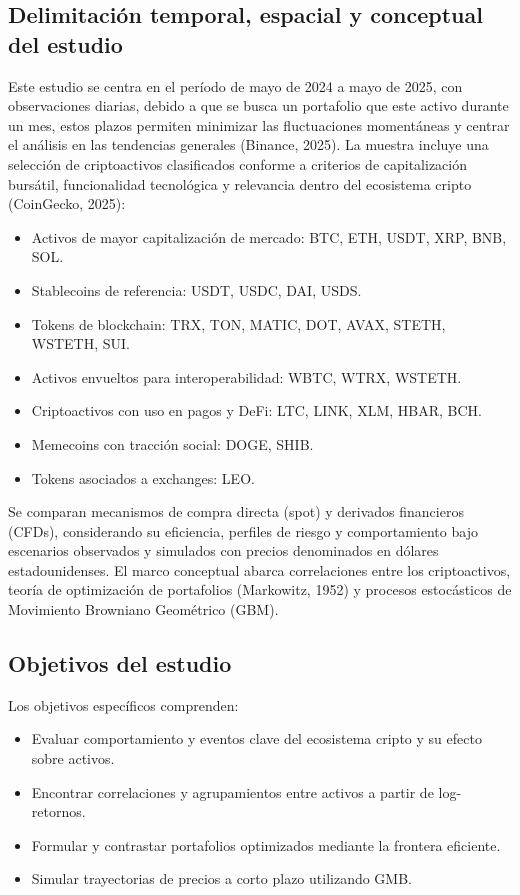 \documentclass[12pt,letterpaper]{article}   %
\begin{document}
\subsection{Delimitación temporal, espacial y conceptual del estudio}
Este estudio se centra en el período de mayo de 2024 a mayo de 2025, con observaciones diarias, debido a que se busca un portafolio que este activo durante un mes, estos plazos permiten minimizar las fluctuaciones momentáneas y centrar el análisis en las tendencias generales (Binance, 2025). La muestra incluye una selección de criptoactivos clasificados conforme a criterios de capitalización bursátil, funcionalidad tecnológica y relevancia dentro del ecosistema cripto (CoinGecko, 2025):

\begin{itemize}
\item Activos de mayor capitalización de mercado: BTC, ETH, USDT, XRP, BNB, SOL. 
\item Stablecoins de referencia: USDT, USDC, DAI, USDS.
\item Tokens de blockchain: TRX, TON, MATIC, DOT, AVAX, STETH, WSTETH, SUI.
\item Activos envueltos para interoperabilidad: WBTC, WTRX, WSTETH.
\item Criptoactivos con uso en pagos y DeFi: LTC, LINK, XLM, HBAR, BCH.
\item Memecoins con tracción social: DOGE, SHIB.
\item Tokens asociados a exchanges: LEO.
\end{itemize}



Se comparan mecanismos de compra directa (spot) y derivados financieros (CFDs), considerando su eficiencia, perfiles de riesgo y comportamiento bajo escenarios observados y simulados con precios denominados en dólares estadounidenses. El marco conceptual abarca correlaciones entre los criptoactivos, teoría de optimización de portafolios (Markowitz, 1952) y procesos estocásticos de Movimiento Browniano Geométrico (GBM).

\subsection{Objetivos del estudio}
Los objetivos específicos comprenden:
\begin{itemize}
\item Evaluar comportamiento y eventos clave del ecosistema cripto y su efecto sobre activos.
\item Encontrar correlaciones y agrupamientos entre activos a partir de log-retornos.
\item Formular y contrastar portafolios optimizados mediante la frontera eficiente.
\item Simular trayectorias de precios a corto plazo utilizando GMB.
\end{itemize}
\end{document}
